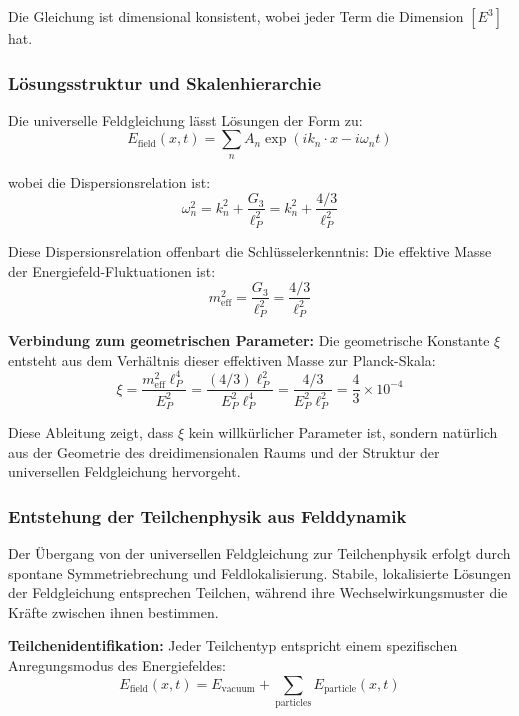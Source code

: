 \documentclass[12pt,a4paper]{article}
\newcommand{\xigeom}{\xi}
\newcommand{\Efield}{E_{\text{field}}}
\begin{document}
	Die Gleichung ist dimensional konsistent, wobei jeder Term die Dimension $[E^3]$ hat.
	
	\subsubsection{Lösungsstruktur und Skalenhierarchie}
	
	Die universelle Feldgleichung lässt Lösungen der Form zu:
	\begin{equation}
		\Efield(x,t) = \sum_n A_n \exp(ik_n \cdot x - i\omega_n t)
	\end{equation}
	
	wobei die Dispersionsrelation ist:
	\begin{equation}
		\omega_n^2 = k_n^2 + \frac{G_3}{\ell_P^2} = k_n^2 + \frac{4/3}{\ell_P^2}
	\end{equation}
	
	Diese Dispersionsrelation offenbart die Schlüsselerkenntnis: Die effektive Masse der Energiefeld-Fluktuationen ist:
	\begin{equation}
		m_{\text{eff}}^2 = \frac{G_3}{\ell_P^2} = \frac{4/3}{\ell_P^2}
	\end{equation}
	
	\textbf{Verbindung zum geometrischen Parameter:} Die geometrische Konstante $\xigeom$ entsteht aus dem Verhältnis dieser effektiven Masse zur Planck-Skala:
	\begin{equation}
		\xigeom = \frac{m_{\text{eff}}^2 \ell_P^4}{E_P^2} = \frac{(4/3) \ell_P^2}{E_P^2 \ell_P^4} = \frac{4/3}{E_P^2 \ell_P^2} = \frac{4}{3} \times 10^{-4}
	\end{equation}
	
	Diese Ableitung zeigt, dass $\xigeom$ kein willkürlicher Parameter ist, sondern natürlich aus der Geometrie des dreidimensionalen Raums und der Struktur der universellen Feldgleichung hervorgeht.
	
	\subsubsection{Entstehung der Teilchenphysik aus Felddynamik}
	
	Der Übergang von der universellen Feldgleichung zur Teilchenphysik erfolgt durch spontane Symmetriebrechung und Feldlokalisierung. Stabile, lokalisierte Lösungen der Feldgleichung entsprechen Teilchen, während ihre Wechselwirkungsmuster die Kräfte zwischen ihnen bestimmen.
	
	\textbf{Teilchenidentifikation:} Jeder Teilchentyp entspricht einem spezifischen Anregungsmodus des Energiefeldes:
	\begin{equation}
		\Efield(x,t) = E_{\text{vacuum}} + \sum_{\text{particles}} E_{\text{particle}}(x,t)
	\end{equation}
	
\end{document}
